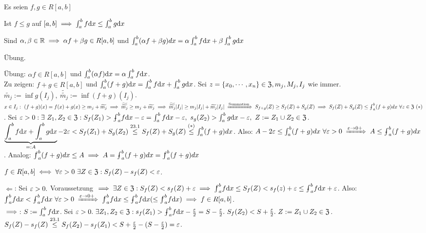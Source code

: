 \documentclass[a4paper,oneside,DIV15,BCOR12mm]{scrbook}
\begin{document}
\begin{satz}
Es seien $f,g \in R[a, b]$
\begin{liste}
\item Ist $f\le g$ auf $[a, b] \implies \int_a^bf\text{d}x \le \int_a^bg\text{d}x$
\item Sind $\alpha, \beta \in \mathbb{R} \implies \alpha f + \beta g \in R[a, b]$ und $\int_a^b(\alpha f + \beta g)dx = \alpha\int_a^bf\text{d}x + \beta\int_a^bg\text{d}x$
\end{liste}
\end{satz}

\begin{beweise}
\item Übung.
\item Übung: $\alpha f \in R[a, b]$ und $\int_a^b(\alpha f)\text{d}x=\alpha\int_a^bf\text{d}x$.\\Zu zeigen: $f+g \in R[a, b]$ und $\int_a^b(f+g)\text{d}x = \int_a^bf\text{d}x + \int_a^bg\text{d}x$.
Sei $z=\{x_0, \cdots, x_n\} \in \mathfrak{Z}, m_j, M_j, I_j$ wie immer. $\widetilde{m_j}:=\inf g(I_j),\ \widetilde{\widetilde{m_j}}:=\inf (f+g)(I_j)$. $x\in I_j:\ (f+g)(x)=f(x)+g(x) \ge m_j + \widetilde{m_j} \folgt \widetilde{\widetilde{m_j}}\ge m_j + \widetilde{m_j} \folgt \widetilde{\widetilde{m_j}}|I_j| \ge m_j|I_j| + \widetilde{m_j}|I_j| \folgtnach{Summation} S_{f+g}(Z) \ge S_f(Z) + S_g(Z) \folgt S_f(Z) + S_g(Z) \le \uint_a^b(f+g)dx \ \forall z \in \Z\ (*)$. Sei $\ep>0: \exists\ Z_1, Z_2 \in \Z: S_f(Z_1) > \uint_a^bf\dx - \ep=\int_a^bf\dx - \ep,\ s_g(Z_2)>\int_a^bg\dx - \ep,\ Z:=Z_1 \cup Z_2 \in \Z$. $\underbrace{\int_a^bf\text{d}x + \int_a^bg\text{d}x}_{=:A} - 2\varepsilon < S_f(Z_1) + S_g(Z_2) \overset{23.1}{\le} S_f(Z) + S_g(Z) \overset{(*)}{\le} \int_a^b (f+g)dx$. Also: $A-2\ep \le \int_a^b(f+g)dx\ \forall \ep>0 \folgtwegen{\ep \to 0+} A\le\uint_a^b(f+g)dx$. Analog: $\oint_a^b(f+g)dx\le A \folgt A=\uint_a^b(f+g)dx = \oint_a^b(f+g)dx$
\end{beweise}

\begin{satz}
$f \in R[a,b] \equizu \forall \ep>0\ \exists Z \in \Z: S_f(Z)-s_f(Z) < \ep$.
\end{satz}
\begin{beweis}
\glqq$\Leftarrow$\grqq: Sei $\varepsilon>0.$ Voraussetzung $\folgt \exists Z \in \Z: S_f(Z)<s_f(Z)+\ep \folgt \oint_a^bf\dx \le S_f(Z) < s_f(z) + \ep\le\uint_a^bf\dx + \ep$. Also: $\oint_a^bf\dx < \uint_a^bf\dx\ \forall \ep>0\folgtwegen{\ep\to 0+}\oint_a^bf\dx \le \uint_a^bf\dx (\le \oint_a^bf\dx)\folgt f\in R[a, b]$.\\
\glqq$\implies$\grqq: $S:=\int_a^bf\text{d}x$. Sei $\ep>0.\ \exists Z_1, Z_2 \in \Z: s_f(Z_1) > \uint_a^bf\dx - \frac{\ep}{2}=S-\frac{\ep}{2}.\ S_f(Z_2)<S+\frac{\ep}{2}.\ Z:=Z_1 \cup Z_2 \in \Z$. $S_f(Z)-s_f(Z) \overset{23.1}{\le}S_f(Z_2)-s_f(Z_1)<S+\frac{\varepsilon}{2}-(S-\frac{\varepsilon}{2})=\varepsilon$.
\end{beweis}
\end{document}
